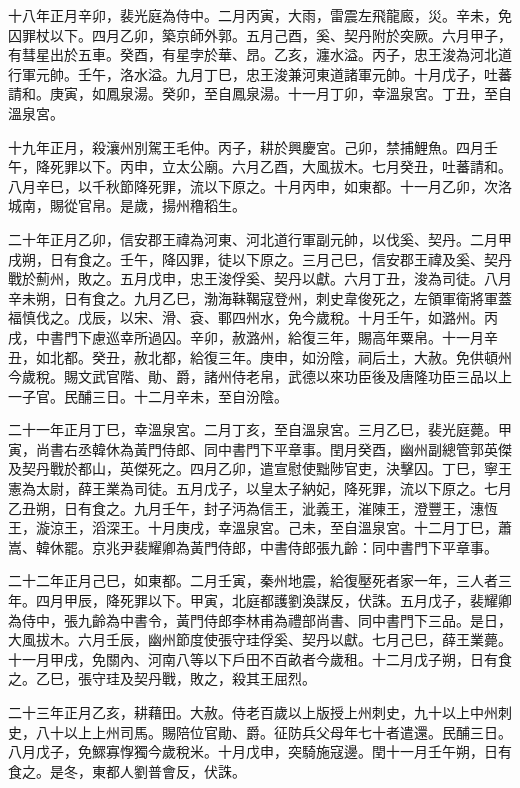 \begin{pinyinscope}
 十八年正月辛卯，裴光庭為侍中。二月丙寅，大雨，雷震左飛龍廄，災。辛未，免囚罪杖以下。四月乙卯，築京師外郭。五月己酉，奚、契丹附於突厥。六月甲子，有彗星出於五車。癸酉，有星孛於華、昂。乙亥，瀍水溢。丙子，忠王浚為河北道行軍元帥。壬午，洛水溢。九月丁巳，忠王浚兼河東道諸軍元帥。十月戊子，吐蕃請和。庚寅，如鳳泉湯。癸卯，至自鳳泉湯。十一月丁卯，幸溫泉宮。丁丑，至自溫泉宮。



 十九年正月，殺瀼州別駕王毛仲。丙子，耕於興慶宮。己卯，禁捕鯉魚。四月壬午，降死罪以下。丙申，立太公廟。六月乙酉，大風拔木。七月癸丑，吐蕃請和。八月辛巳，以千秋節降死罪，流以下原之。十月丙申，如東都。十一月乙卯，次洛城南，賜從官帛。是歲，揚州穞稻生。



 二十年正月乙卯，信安郡王禕為河東、河北道行軍副元帥，以伐奚、契丹。二月甲戌朔，日有食之。壬午，降囚罪，徒以下原之。三月己巳，信安郡王禕及奚、契丹戰於薊州，敗之。五月戊申，忠王浚俘奚、契丹以獻。六月丁丑，浚為司徒。八月辛未朔，日有食之。九月乙巳，渤海靺鞨寇登州，刺史韋俊死之，左領軍衛將軍蓋福慎伐之。戊辰，以宋、滑、袞、鄆四州水，免今歲稅。十月壬午，如潞州。丙戌，中書門下慮巡幸所過囚。辛卯，赦潞州，給復三年，賜高年粟帛。十一月辛丑，如北都。癸丑，赦北都，給復三年。庚申，如汾陰，祠后土，大赦。免供頓州今歲稅。賜文武官階、勛、爵，諸州侍老帛，武德以來功臣後及唐隆功臣三品以上一子官。民酺三日。十二月辛未，至自汾陰。



 二十一年正月丁巳，幸溫泉宮。二月丁亥，至自溫泉宮。三月乙巳，裴光庭薨。甲寅，尚書右丞韓休為黃門侍郎、同中書門下平章事。閏月癸酉，幽州副總管郭英傑及契丹戰於都山，英傑死之。四月乙卯，遣宣慰使黜陟官吏，決擊囚。丁巳，寧王憲為太尉，薛王業為司徒。五月戊子，以皇太子納妃，降死罪，流以下原之。七月乙丑朔，日有食之。九月壬午，封子沔為信王，泚義王，漼陳王，澄豐王，潓恆王，漩涼王，滔深王。十月庚戌，幸溫泉宮。己未，至自溫泉宮。十二月丁巳，蕭嵩、韓休罷。京兆尹裴耀卿為黃門侍郎，中書侍郎張九齡：同中書門下平章事。



 二十二年正月己巳，如東都。二月壬寅，秦州地震，給復壓死者家一年，三人者三年。四月甲辰，降死罪以下。甲寅，北庭都護劉渙謀反，伏誅。五月戊子，裴耀卿為侍中，張九齡為中書令，黃門侍郎李林甫為禮部尚書、同中書門下三品。是日，大風拔木。六月壬辰，幽州節度使張守珪俘奚、契丹以獻。七月己巳，薛王業薨。十一月甲戌，免關內、河南八等以下戶田不百畝者今歲租。十二月戊子朔，日有食之。乙巳，張守珪及契丹戰，敗之，殺其王屈烈。



 二十三年正月乙亥，耕藉田。大赦。侍老百歲以上版授上州刺史，九十以上中州刺史，八十以上上州司馬。賜陪位官勛、爵。征防兵父母年七十者遣還。民酺三日。八月戊子，免鰥寡惸獨今歲稅米。十月戊申，突騎施寇邊。閏十一月壬午朔，日有食之。是冬，東都人劉普會反，伏誅。




\end{pinyinscope}
